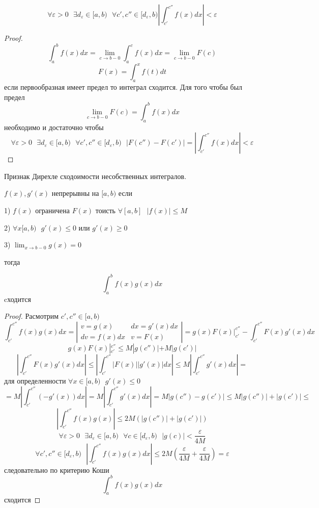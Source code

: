 \begin{block}[Критерий]
  $$
  \forall \varepsilon > 0 ~~~ \exists d_{\varepsilon} \in [a,b) ~~~
  \forall c', c'' \in [d_{\varepsilon}, b) \left| \int_{c'}^{c''} f(x)dx \right| < \varepsilon
  $$
\end{block}

\begin{proof}
  $$
  \int_a^b f(x)dx = \lim_{c \to b-0} \int_a^c f(x)dx = \lim_{c \to b-0} F(c)
  $$
  $$
  F(x) = \int_a^x f(t)dt
  $$
  если первообразная имеет предел то интеграл сходится. Для того чтобы был
  предел
  $$
  \lim_{c \to b-0} F(c) = \int_a^b f(x)dx
  $$
  необходимо и достаточно чтобы
  $$
  \forall \varepsilon > 0 ~~~ \exists d_{\varepsilon} \in [a,b) ~~~
  \forall c', c'' \in [d_{\varepsilon}, b) ~~~
  |F(c'') - F(c')| = \left|\int_{c'}^{c''} f(x) dx \right| < \varepsilon
  $$
\end{proof}

\begin{title}[\Large]
  Признак Дирехле сходоимости несобственных интегралов.
\end{title}

\begin{block}[Признак]
  $f(x), g'(x)$ непрерывны на $[a,b)$ если

  1) $f(x)$ ограничена $F(x)$ тоисть $\forall [a,b] ~~~ |f(x)| \le M$

  2) $\forall x[a,b) ~~~ g'(x) \le 0$ или $g'(x) \ge 0$

  3) $\lim_{x \to b-0} g(x) = 0$

  тогда

  $$\int_a^b f(x)g(x)dx$$ cходится
\end{block}

\begin{proof}
  Расмотрим $c',c'' \in [a,b)$
  $$
  \int_{c'}^{c''} f(x)g(x)dx =
  \left|
    \begin{array}{ll}
      v = g(x)    & dx = g'(x)dx \\
      dv = f(x)dx & v = F(x)
    \end{array}
  \right|
  = g(x)F(x)|_{c'}^{c''} - \int_{c'}^{c''} F(x)g'(x)dx
  $$
  $$
  g(x)F(x)|_{c'}^{c''} \le M |g(c'')| + M |g(c')|
  $$
  $$
  \left| \int_{c'}^{c''} F(x)g'(x)dx \right| \le
  \left| \int_{c'}^{c''} |F(x)||g'(x)|dx \right| \le
  M \left| \int_{c'}^{c''} g'(x)dx \right| =
  $$
  для определенности $\forall x \in [a,b) ~~~ g'(x) \le 0$
  $$
  = M \left| \int_{c'}^{c''} (-g'(x))dx \right| =
  M \left| \int_{c'}^{c''} g'(x)dx \right| =
  M|g(c'') - g(c')| \le
  M|g(c'')| + |g(c')| \le
  $$
  $$
  \left| \int_{c'}^{c''} f(x)g(x) \right| \le 2M(|g(c'')| + |g(c')|)
  $$
  $$
  \forall \varepsilon > 0 ~~~ \exists d_{\varepsilon} \in [a,b) ~~~
  \forall c \in [d_{\varepsilon}, b) ~~~ |g(c)| < \frac{\varepsilon}{4M}
  $$
  $$
  \forall c', c'' \in [d_{\varepsilon}, b) ~~~
  \left| \int_{c'}^{c''} f(x)g(x)dx \right| \le
  2M \left( \frac{\varepsilon}{4M} + \frac{\varepsilon}{4M}\right) = \varepsilon
  $$
  следовательно по критерию Коши
  $$
  \int_a^b f(x)g(x)dx
  $$
  сходится
\end{proof}

